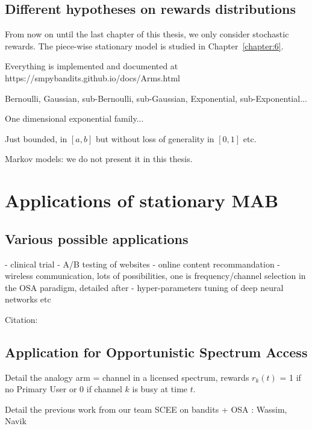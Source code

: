 \subsection{Different hypotheses on rewards distributions}


From now on until the last chapter of this thesis, we only consider stochastic rewards. The piece-wise stationary model is studied in Chapter~\ref{chapter:6}.

Everything is implemented and documented at
https://smpybandits.github.io/docs/Arms.html

Bernoulli, Gaussian, sub-Bernoulli, sub-Gaussian, Exponential, sub-Exponential...

One dimensional exponential family...

Just bounded, in $[a,b]$ but without loss of generality in $[0,1]$ etc.

Markov models: we do not present it in this thesis.


\section{Applications of stationary MAB}
\label{sec:2:applicationsofStationaryMAB}

\subsection{Various possible applications}

- clinical trial
- A/B testing of websites
- online content recommandation
- wireless communication, lots of possibilities, one is frequency/channel selection in the OSA paradigm, detailed after
- hyper-parameters tuning of deep neural networks etc


Citation: \cite{bouneffouf2019survey}


\subsection{Application for Opportunistic Spectrum Access}

Detail the analogy arm = channel in a licensed spectrum, rewards $r_k(t)$ = 1 if no Primary User or 0 if channel $k$ is busy at time $t$.

Detail the previous work from our team SCEE on bandits + OSA : Wassim, Navik



